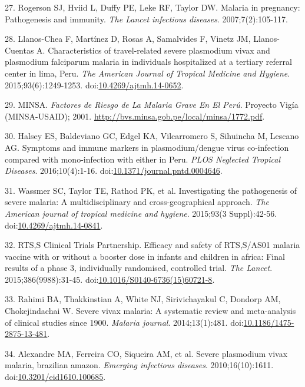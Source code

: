 \documentclass[]{article}
\begin{document}
\hypertarget{ref-rogerson2007preg}{}
27. Rogerson SJ, Hviid L, Duffy PE, Leke RF, Taylor DW. Malaria in
pregnancy: Pathogenesis and immunity. \emph{The Lancet infectious
diseases}. 2007;7(2):105-117.

\hypertarget{ref-llanoschea2015}{}
28. Llanos-Chea F, Martínez D, Rosas A, Samalvides F, Vinetz JM,
Llanos-Cuentas A. Characteristics of travel-related severe plasmodium
vivax and plasmodium falciparum malaria in individuals hospitalized at a
tertiary referral center in lima, Peru. \emph{The American Journal of
Tropical Medicine and Hygiene}. 2015;93(6):1249-1253.
doi:\href{https://doi.org/10.4269/ajtmh.14-0652}{10.4269/ajtmh.14-0652}.

\hypertarget{ref-factores2001}{}
29. MINSA. \emph{Factores de Riesgo de La Malaria Grave En El Perú}.
Proyecto Vigía (MINSA-USAID); 2001.
\url{http://bvs.minsa.gob.pe/local/minsa/1772.pdf}.

\hypertarget{ref-baldevi2016}{}
30. Halsey ES, Baldeviano GC, Edgel KA, Vilcarromero S, Sihuincha M,
Lescano AG. Symptoms and immune markers in plasmodium/dengue virus
co-infection compared with mono-infection with either in Peru.
\emph{PLOS Neglected Tropical Diseases}. 2016;10(4):1-16.
doi:\href{https://doi.org/10.1371/journal.pntd.0004646}{10.1371/journal.pntd.0004646}.

\hypertarget{ref-wassmer2015}{}
31. Wassmer SC, Taylor TE, Rathod PK, et al. Investigating the
pathogenesis of severe malaria: A multidisciplinary and
cross-geographical approach. \emph{The American journal of tropical
medicine and hygiene}. 2015;93(3 Suppl):42-56.
doi:\href{https://doi.org/10.4269/ajtmh.14-0841}{10.4269/ajtmh.14-0841}.

\hypertarget{ref-rts2015}{}
32. RTS,S Clinical Trials Partnership. Efficacy and safety of RTS,S/AS01
malaria vaccine with or without a booster dose in infants and children
in africa: Final results of a phase 3, individually randomised,
controlled trial. \emph{The Lancet}. 2015;386(9988):31-45.
doi:\href{https://doi.org/10.1016/S0140-6736(15)60721-8}{10.1016/S0140-6736(15)60721-8}.

\hypertarget{ref-rahimi2014meta}{}
33. Rahimi BA, Thakkinstian A, White NJ, Sirivichayakul C, Dondorp AM,
Chokejindachai W. Severe vivax malaria: A systematic review and
meta-analysis of clinical studies since 1900. \emph{Malaria journal}.
2014;13(1):481.
doi:\href{https://doi.org/10.1186/1475-2875-13-481}{10.1186/1475-2875-13-481}.

\hypertarget{ref-alexandre2010}{}
34. Alexandre MA, Ferreira CO, Siqueira AM, et al. Severe plasmodium
vivax malaria, brazilian amazon. \emph{Emerging infectious diseases}.
2010;16(10):1611.
doi:\href{https://doi.org/10.3201/eid1610.100685}{10.3201/eid1610.100685}.
\end{document}
